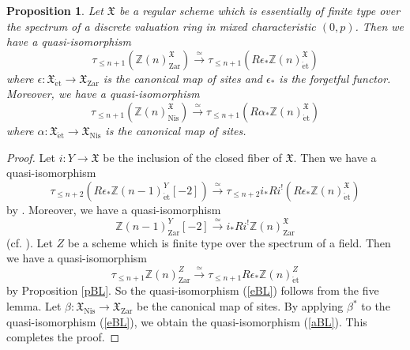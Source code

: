 \documentclass{article}
\newtheorem{prop}[thm]{\indent \sc Proposition}
\newcommand{\et}{\mathrm{\acute{e}t}}
\newcommand{\Nis}{\mathrm{Nis}}
\newcommand{\Zar}{\mathrm{Zar}}
\begin{document}
%
\begin{prop}\upshape\label{SBL}
Let $\mathfrak{X}$ be a regular scheme which is essentially of 
finite type over the spectrum of a discrete valuation ring in
mixed characteristic $(0, p)$. Then we have a quasi-isomorphism
%
\begin{equation}\label{eBL}
\tau_{\leq n+1}\left(
\mathbb{Z}(n)_{\Zar}^{\mathfrak{X}}
\right)
\xrightarrow{\simeq}
\tau_{\leq n+1}\left(
R\epsilon_{*}
\mathbb{Z}(n)_{\et}^{\mathfrak{X}}
\right)
\end{equation}
%
where $\epsilon: \mathfrak{X}_{\et}\to \mathfrak{X}_{\Zar}$ 
is the canonical map of sites and $\epsilon_{*}$ is the
forgetful functor. Moreover, 
we have a quasi-isomorphism
%
\begin{equation}\label{aBL}
\tau_{\leq n+1}\left(
\mathbb{Z}(n)_{\Nis}^{\mathfrak{X}}
\right)
\xrightarrow{\simeq}
\tau_{\leq n+1}\left(
R\alpha_{*}
\mathbb{Z}(n)_{\et}^{\mathfrak{X}}
\right)
\end{equation}
%
where $\alpha: \mathfrak{X}_{\et}\to \mathfrak{X}_{\Nis}$ 
is the canonical map of sites.
\end{prop}
%

%
\begin{proof}\upshape
Let $i: Y\to \mathfrak{X}$ be the inclusion of the closed fiber of $\mathfrak{X}$.
Then we have a quasi-isomorphism
%
\begin{equation*}
\tau_{\leq n+2}\left(
R\epsilon_{*}\mathbb{Z}(n-1)_{\et}^{Y}
[-2]
\right)
\xrightarrow{\simeq}
\tau_{\leq n+2}i_{*}Ri^{!}\left(
R\epsilon_{*}
\mathbb{Z}(n)_{\et}^{\mathfrak{X}}
\right)
\end{equation*}
%
by \cite[p.33, Proposition 2.1]{SM}. Moreover, we have a quasi-isomorphism
%
%
\begin{equation*}
\mathbb{Z}(n-1)_{\Zar}^{Y}
[-2]
\xrightarrow{\simeq}
i_{*}Ri^{!}
\mathbb{Z}(n)_{\Zar}^{\mathfrak{X}}
\end{equation*}
%
(cf. \cite[p.780, (6)]{Ge}).
Let $Z$ be a scheme which is finite type over the spectrum of a field. Then we have 
a quasi-isomorphism
%
\begin{equation*}
\tau_{\leq n+1}
\mathbb{Z}(n)_{\Zar}^{Z}
\xrightarrow{\simeq}
\tau_{\leq n+1}
R\epsilon_{*}\mathbb{Z}(n)_{\et}^{Z}
\end{equation*}
%
by Proposition \ref{pBL}. So the quasi-isomorphism (\ref{eBL}) follows from the five lemma.
Let $\beta: \mathfrak{X}_{\Nis}\to\mathfrak{X}_{\Zar}$ be the canonical map of sites. 
By applying $\beta^{*}$ to the quasi-isomorphism (\ref{eBL}), 
we obtain the quasi-isomorphism (\ref{aBL}). This completes the proof.
\end{proof}
%
\end{document}
